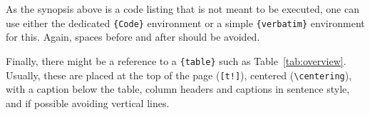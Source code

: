 \documentclass[article]{jss}
\begin{document}
\begin{leftbar}
As the synopsis above is a code listing that is not meant to be executed,
one can use either the dedicated \verb|{Code}| environment or a simple
\verb|{verbatim}| environment for this. Again, spaces before and after should be
avoided.

Finally, there might be a reference to a \verb|{table}| such as
Table~\ref{tab:overview}. Usually, these are placed at the top of the page
(\verb|[t!]|), centered (\verb|\centering|), with a caption below the table,
column headers and captions in sentence style, and if possible avoiding vertical
lines.
\end{leftbar}

%












































\end{document}
